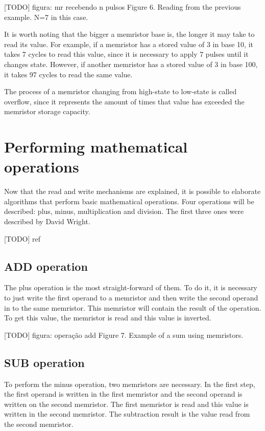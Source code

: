 \documentclass[ecp,tc,english]{iiufrgs}
\begin{document}
[TODO] figura: mr recebendo n pulsos
Figure 6. Reading from the previous example. N=7 in this case.

It is worth noting that the bigger a memristor base is, the longer it may take to read its value. For example, if a memristor has a stored value of 3 in base 10, it takes 7 cycles to read this value, since it is necessary to apply 7 pulses until it changes state. However, if another memristor has a stored value of 3 in base 100, it takes 97 cycles to read the same value.

The process of a memristor changing from high-state to low-state is called overflow, since it represents the amount of times that value has exceeded the memristor storage capacity.

\chapter{Performing mathematical operations}

Now that the read and write mechanisms are explained, it is possible to elaborate algorithms that perform basic mathematical operations. Four operations will be described: plus, minus, multiplication and division. The first three ones were described by David Wright.

[TODO] ref

\section{ADD operation}

The plus operation is the most straight-forward of them. To do it, it is necessary to just write the first operand to a memristor and then write the second operand in to the same memristor. This memristor will contain the result of the operation. To get this value, the memristor is read and this value is inverted.

[TODO] figura: operação add
Figure 7. Example of a sum using memristors.

\section{SUB operation}

To perform the minus operation, two memristors are necessary. In the first step, the first operand is written in the first memristor and the second operand is written on the second memristor. The first memristor is read and this value is written in the second memristor. The subtraction result is the value read from the second memristor.
\end{document}
